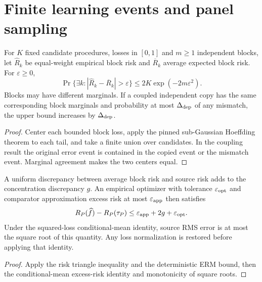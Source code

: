 \section{Finite learning events and panel
sampling}\label{sec:bp-finite-learning}

\begin{theorem}\label{thm:finite-block-concentration}
  \leanok
  For $K$ fixed candidate procedures, losses in $[0,1]$ and $m\ge1$ independent
  blocks, let $\widehat R_k$ be equal-weight empirical block risk and
  $\overline R_k$ average expected block risk. For $\varepsilon\ge0$,
  \[
    \Pr\{\exists k:|\widehat R_k-\overline R_k|>\varepsilon\}
    \le2K\exp(-2m\varepsilon^2).
  \]
  Blocks may have different marginals. If a coupled independent copy has the
  same corresponding block marginals and probability at most $\Delta_{\rm dep}$
  of any mismatch, the upper bound increases by $\Delta_{\rm dep}$.
\end{theorem}
\begin{proof}\leanok
  Center each bounded block loss, apply the pinned sub-Gaussian Hoeffding
  theorem to each tail, and take a finite union over candidates. In the
  coupling result the original error event is contained in the copied event
  or the mismatch event. Marginal agreement makes the two centers equal.
\end{proof}

\begin{corollary}\label{thm:selection-task-error}
  \leanok
  A uniform discrepancy between average block risk and source risk adds to
  the concentration discrepancy $g$. An empirical optimizer with tolerance
  $\varepsilon_{\rm opt}$ and comparator approximation excess risk at most
  $\varepsilon_{\rm app}$ then satisfies
  \[
    R_P(\widehat f)-R_P(\tau_P)
    \le\varepsilon_{\rm app}+2g+\varepsilon_{\rm opt}.
  \]
  Under the squared-loss conditional-mean identity, source RMS error is at
  most the square root of this quantity. Any loss normalization is restored
  before applying that identity.
\end{corollary}
\begin{proof}\leanok
  Apply the risk triangle inequality and the deterministic ERM bound, then
  the conditional-mean excess-risk identity and monotonicity of square roots.
\end{proof}

